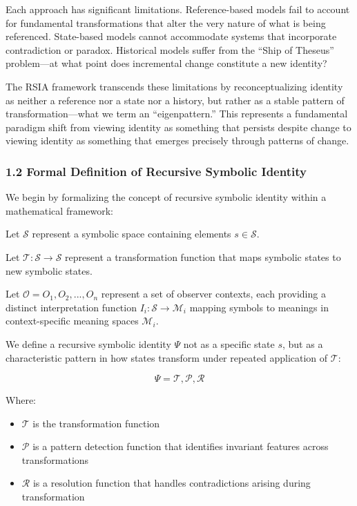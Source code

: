 \documentclass[12pt]{article}
\providecommand{\tightlist}{%
  \setlength{\itemsep}{0pt}\setlength{\parskip}{0pt}}
\begin{document}
Each approach has significant limitations. Reference-based models fail
to account for fundamental transformations that alter the very nature of
what is being referenced. State-based models cannot accommodate systems
that incorporate contradiction or paradox. Historical models suffer from
the ``Ship of Theseus'' problem---at what point does incremental change
constitute a new identity?

The RSIA framework transcends these limitations by reconceptualizing
identity as neither a reference nor a state nor a history, but rather as
a stable pattern of transformation---what we term an ``eigenpattern.''
This represents a fundamental paradigm shift from viewing identity as
something that persists despite change to viewing identity as something
that emerges precisely through patterns of change.

\subsubsection{1.2 Formal Definition of Recursive Symbolic
Identity}\label{formal-definition-of-recursive-symbolic-identity}

We begin by formalizing the concept of recursive symbolic identity
within a mathematical framework:

Let \(\mathcal{S}\) represent a symbolic space containing elements
\(s \in \mathcal{S}\).

Let \(\mathcal{T}: \mathcal{S} \rightarrow \mathcal{S}\) represent a
transformation function that maps symbolic states to new symbolic
states.

Let \(\mathcal{O} = {O_1, O_2, ..., O_n}\) represent a set of observer
contexts, each providing a distinct interpretation function
\(I_i: \mathcal{S} \rightarrow \mathcal{M}_i\) mapping symbols to
meanings in context-specific meaning spaces \(\mathcal{M}_i\).

We define a recursive symbolic identity \(\Psi\) not as a specific state
\(s\), but as a characteristic pattern in how states transform under
repeated application of \(\mathcal{T}\):

\[\Psi = {\mathcal{T}, \mathcal{P}, \mathcal{R}}\]

Where:

\begin{itemize}
\tightlist
\item
  \(\mathcal{T}\) is the transformation function
\item
  \(\mathcal{P}\) is a pattern detection function that identifies
  invariant features across transformations
\item
  \(\mathcal{R}\) is a resolution function that handles contradictions
  arising during transformation
\end{itemize}
\end{document}
